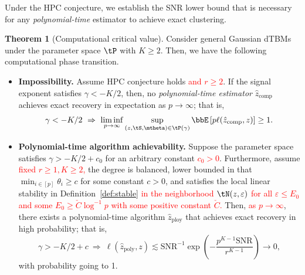 \documentclass[lettersize,onecolumn,journal]{IEEEtran}
\theoremstyle{definition}
\newtheorem{thm}{Theorem}
\theoremstyle{definition}
\newcommand{\of}[1]{\left(#1\right)}
\begin{document}
Under the HPC conjecture, we establish the SNR lower bound that is necessary for any \emph{polynomial-time} estimator to achieve exact clustering.

{
\color{blue}
\begin{thm}[Computational critical value]\label{thm:comp} 
Consider general Gaussian dTBMs under the parameter space $\tP$ with $K\geq 2$. Then, we have the following computational phase transition.

\begin{itemize}[wide]
    \item \textbf{Impossibility.} Assume HPC conjecture holds \textcolor{red}{and $r \geq 2$}. If the signal exponent satisfies $\gamma < -K/2$, then, no \emph{polynomial-time estimator} $\hat z_{\text{comp}}$ achieves exact recovery in expectation as $p\to \infty$; that is, 
\begin{align}
  \gamma<-K/2 \ \Rightarrow \ \liminf_{p\to \infty}\sup_{(z, \tS, \mtheta) \in \tP(\gamma)}  \bbE \left[ p\ell(\hat z_{\text{comp}}, z) \right]\geq 1.
\end{align}
\item \textbf{Polynomial-time algorithm achievability.} Suppose the parameter space satisfies $\gamma  >  -K/2+c_0$ for an arbitrary constant \textcolor{red}{$c_0>0$}. Furthermore, assume \textcolor{red}{fixed $r \geq 1, K \geq 2$,} the degree is balanced, lower bounded in that $\min_{i\in[p]}\theta_i\geq c$ for some constant $c>0$, and satisfies the local linear stability in Definition~\ref{def:stable} \textcolor{red}{in the neighborhood $\tN(z,\varepsilon)$ for all $\varepsilon \leq E_0$ and some $E_0 \geq \check{C}\log^{-1}p $ with some positive constant $\check{C}$.}
Then, \textcolor{red}{as $p \rightarrow \infty$}, there exists a polynomial-time algorithm $\hat z_{\text{ploy}}$ that achieves exact recovery in high probability; that is,
\begin{equation}
  \gamma>-K/2+c\ \Rightarrow   \  \ell(\hat z_{\text{poly}}, z) \lesssim \text{SNR}^{-1}\exp \of{ - \frac{p^{K-1}\text{SNR}}{r^{K-1}} } \to 0,
\end{equation}
with probability going to 1. 
\end{itemize}

\end{thm}
}
\end{document}
